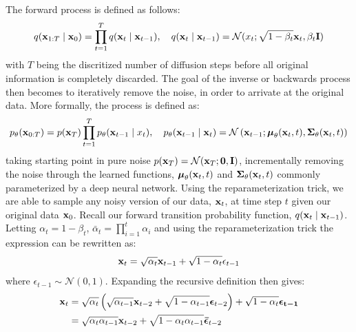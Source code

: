The forward process is defined as follows:
\begin{equation}    
    q(\boldsymbol{\mathbf{x}}_{1:T} \mid \boldsymbol{\mathbf{x}}_{0}) = \prod_{t=1}^T q(\boldsymbol{\mathbf{x}}_{t} \mid \boldsymbol{\mathbf{x}}_{t-1}), \quad q(\boldsymbol{\mathbf{x}}_{t} \mid \boldsymbol{\mathbf{x}}_{t-1}) = \mathcal{N}(x_{t}; \sqrt{1 - \beta_t}\boldsymbol{\mathbf{x}}_t,\beta_t \boldsymbol{\mathbf{I}} )
    \label{eq:diffusion}
\end{equation}
with $T$ being the discritized number of diffusion steps before all original information is completely discarded. The goal of the inverse or backwards process then becomes to iteratively remove the noise, in order to arrivate at the original data. More formally, the process is defined as:
\begin{equation}
    p_\theta(\boldsymbol{\mathbf{x}}_{0:T}) = p(\boldsymbol{\mathbf{x}}_T) \prod_{t=1}^T p_\theta(\boldsymbol{\mathbf{x}}_{t-1} \mid x_{t}), \quad p_\theta(\boldsymbol{\mathbf{x}}_{t-1} \mid \boldsymbol{\mathbf{x}}_{t}) = \mathcal{N}\left(\boldsymbol{\mathbf{x}}_{t-1}; \boldsymbol{\mathbf{\mu}}_\theta(\boldsymbol{\mathbf{x}}_t, t), \boldsymbol{\mathbf{\Sigma}}_\theta(\boldsymbol{\mathbf{x}}_t, t) \right)
\end{equation}
taking starting point in pure noise $p(\boldsymbol{\mathbf{x}}_T) = \mathcal{N}(\boldsymbol{\mathbf{x}}_T; \boldsymbol{\mathbf{0}}, \boldsymbol{\mathbf{I}})$, incrementally removing the noise through the learned functions, $\boldsymbol{\mathbf{\mu}}_\theta(\boldsymbol{\mathbf{x}}_t, t)$ and $\boldsymbol{\mathbf{\Sigma}}_\theta(\boldsymbol{\mathbf{x}}_t, t)$ commonly parameterized by a deep neural network.
Using the reparameterization trick, we are able to sample any noisy version of our data, $\boldsymbol{\mathbf{x}}_t$, at time step $t$ given our original data $\boldsymbol{\mathbf{x}}_0$. Recall our forward transition probability function, $q(\boldsymbol{\mathbf{x}}_t \mid \boldsymbol{\mathbf{x}}_{t-1})$. Letting $\alpha_t = 1 - \beta_t$, $\bar{\alpha}_t = \prod_{i=1}^t \alpha_i$ and using the reparameterization trick the expression can be rewritten as:
\begin{equation}
    \boldsymbol{\mathbf{x}}_t = \sqrt{\alpha_t} \boldsymbol{\mathbf{x}}_{t-1} + \sqrt{1 - \alpha_t} \epsilon_{t-1}
\end{equation}
where $\epsilon_{t-1} \sim \mathcal{N}(0,1)$. Expanding the recursive definition then gives:
\begin{align*}
    \vect{x}_t    %
                    & = \sqrt{\alpha_t} \left( \sqrt{\alpha_{t-1}} \vect{x}_{t-2} + \sqrt{1 - \alpha_{t-1}} \vect{\epsilon}_{t-2} \right) + \sqrt{1 - \alpha_t} \vect{\epsilon_{t-1}} \\
                    & = \sqrt{\alpha_t \alpha_{t-1}} \vect{x}_{t-2} + \sqrt{1 - \alpha_{t}\alpha_{t-1}} \vect{\bar{\epsilon}}_{t-2}
\end{align*}
